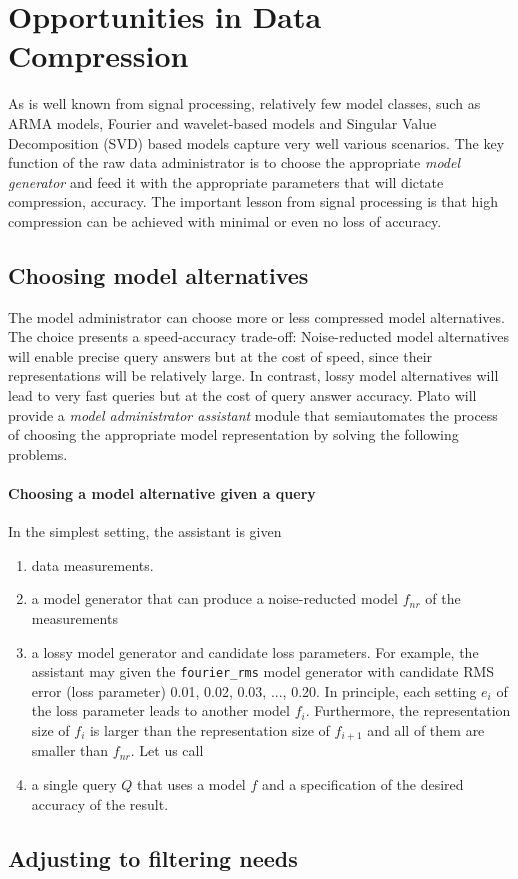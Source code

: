 
\section{Opportunities in Data Compression}
\label{sec:compression}
As is well known from signal processing, relatively few model classes, such as ARMA models, Fourier and wavelet-based models and Singular Value Decomposition (SVD) based models capture very well various scenarios. The key function of the raw data administrator is to choose the appropriate {\em model generator} and feed it with the appropriate parameters that will dictate compression, accuracy. The important lesson from signal processing is that high compression can be achieved with minimal or even no loss of accuracy.


\subsection{Choosing model alternatives}
\label{sec:choosing-model-alternatives}
The model administrator can choose more or less compressed model alternatives. The choice presents a speed-accuracy trade-off: Noise-reducted model alternatives will enable precise query answers but at the cost of speed, since their representations will be relatively large. In contrast, 
lossy model alternatives will lead to very fast queries but at the cost of query answer accuracy. Plato will provide a {\em model administrator assistant} module that semiautomates the process of choosing the appropriate model representation by solving the following problems.


\paragraph{Choosing a model alternative given a query}
In the simplest setting, the assistant is given
\begin{enumerate} 
%
\item data measurements.
%
\item a model generator that can produce a noise-reducted model $f_{nr}$ of the measurements
%
\item a lossy model generator and candidate loss parameters. For example, the assistant may given the \texttt{fourier\_rms} model generator with candidate RMS error (loss parameter) 0.01, 0.02, 0.03, ..., 0.20. In principle, each setting $e_i$ of the loss parameter leads to another model $f_i$. Furthermore, the representation size of $f_i$ is larger than the representation size of $f_{i+1}$ and all of them are smaller than $f_{nr}$. Let us call 
%
\item a single query $Q$ that uses a model $f$ and a specification of the desired accuracy of the result.
%
\end{enumerate}

\subsection{Adjusting to filtering needs}
